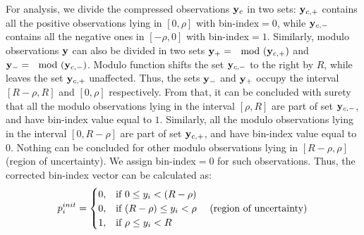 For analysis, we divide the compressed observations $\mathbf{y}_c$ in two sets: $\mathbf{y}_{c,+}$ contains all the positive observations lying in $[0,\rho]$ with bin-index$=0$, while $\mathbf{y}_{c,-}$ contains all the negative ones in $[-\rho,0]$ with bin-index$=1$. Similarly, modulo observations $\mathbf{y}$ can also be divided in two sets $\mathbf{y}_+ = \mod(\mathbf{y}_{c,+})$ and $\mathbf{y}_- = \mod(\mathbf{y}_{c,-})$. Modulo function shifts the set $\mathbf{y}_{c,-}$ to the right by $R$, while leaves the set $\mathbf{y}_{c,+}$ unaffected. Thus, the sets $\mathbf{y}_-$ and $\mathbf{y}_+$ occupy the interval $[R-\rho,R]$ and $[0,\rho]$ respectively. From that, it can be concluded with surety that all the modulo observations lying in the interval $[\rho, R]$ are part of set $\mathbf{y}_{c,-}$, and have bin-index value equal to $1$. Similarly, all the modulo observations lying in the interval $[0,R-\rho]$ are part of set $\mathbf{y}_{c,+}$, and have bin-index value equal to $0$. Nothing can be concluded for other modulo observations lying in $[R-\rho,\rho]$ (region of uncertainty). We assign bin-index$=0$ for such observations. Thus, the corrected bin-index vector can be calculated as:
\begin{equation}
{p}^{init}_{i} = 
\begin{cases}
0,& \text{if } 0\leq y_i < (R-\rho) \\
0,& \text{if } (R-\rho)\leq y_i < \rho ~~~~ \textnormal{(region of uncertainty)} \\
1,& \text{if } \rho \leq y_i < R \\
\end{cases}
\label{eq:rcm}
\end{equation}
